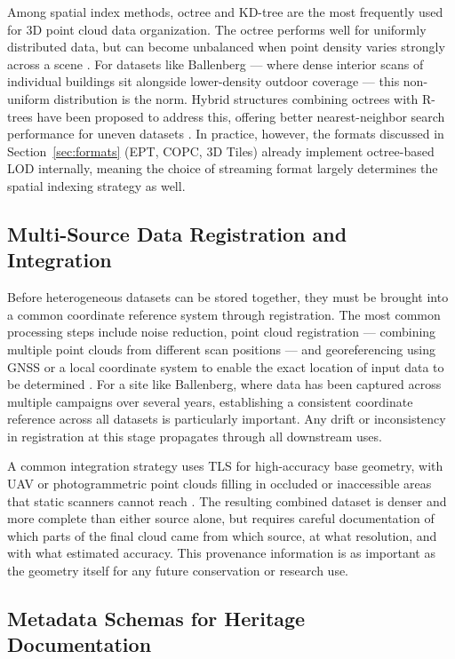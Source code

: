 \documentclass[]{report}
\begin{document}
Among spatial index methods, octree and KD-tree are the most frequently used for 3D point
cloud data organization. The octree performs well for uniformly distributed data, but can
become unbalanced when point density varies strongly across a scene \cite{jiang2021hybrid}.
For datasets like Ballenberg --- where dense interior scans of individual buildings sit
alongside lower-density outdoor coverage --- this non-uniform distribution is the norm. Hybrid
structures combining octrees with R-trees have been proposed to address this, offering better
nearest-neighbor search performance for uneven datasets \cite{jiang2021hybrid}. In practice,
however, the formats discussed in Section~\ref{sec:formats} (EPT, COPC, 3D Tiles) already
implement octree-based LOD internally, meaning the choice of streaming format largely
determines the spatial indexing strategy as well.

\subsection{Multi-Source Data Registration and Integration}

Before heterogeneous datasets can be stored together, they must be brought into a common
coordinate reference system through registration. The most common processing steps include
noise reduction, point cloud registration --- combining multiple point clouds from different
scan positions --- and georeferencing using GNSS or a local coordinate system to enable the
exact location of input data to be determined \cite{pepe2024integration}. For a site like
Ballenberg, where data has been captured across multiple campaigns over several years,
establishing a consistent coordinate reference across all datasets is particularly important.
Any drift or inconsistency in registration at this stage propagates through all downstream
uses.

A common integration strategy uses TLS for high-accuracy base geometry, with UAV or
photogrammetric point clouds filling in occluded or inaccessible areas that static scanners
cannot reach \cite{hassan2021scanner}. The resulting combined dataset is denser and more
complete than either source alone, but requires careful documentation of which parts of the
final cloud came from which source, at what resolution, and with what estimated accuracy. This
provenance information is as important as the geometry itself for any future conservation or
research use.

\subsection{Metadata Schemas for Heritage Documentation}
\end{document}
